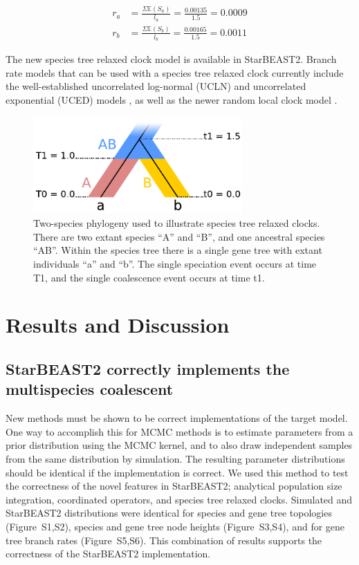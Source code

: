\documentclass[nogrid]{MBE}%
\begin{document}
\begin{align}
r_a &= \frac{\Sigma \mathbb{E}(S_a)}{l_a} = \frac{0.00135}{1.5} = 0.0009\\
r_b &= \frac{\Sigma \mathbb{E}(S_b)}{l_b} = \frac{0.00165}{1.5} = 0.0011
\end{align}

The new species tree relaxed clock model is available in StarBEAST2. Branch rate
models that can be used with a species tree relaxed clock currently include the
well-established uncorrelated log-normal (UCLN) and uncorrelated exponential
(UCED) models \citep{10.1371/journal.pbio.0040088}, as well as the newer random
local clock model \citep{Drummond2010}.

\begin{figure}[htb!]
\centering
\includegraphics[width=80mm]{relaxed_clock.pdf}
\caption
{Two-species phylogeny used to illustrate species tree relaxed
clocks. There are two extant species ``A'' and ``B'', and one ancestral species ``AB''.
Within the species tree there is a single gene tree with extant individuals ``a''
and ``b''. The single speciation event occurs at time T1, and the single coalescence
event occurs at time t1.}
\label{fig:branchRateModel}
\end{figure}

\section{Results and Discussion}

\subsection{StarBEAST2 correctly implements the multispecies coalescent}

New methods must be shown to be correct implementations of the target model.
One way to accomplish this for MCMC methods is to estimate parameters from a
prior distribution using the MCMC kernel, and to also draw independent samples
from the same distribution by simulation. The resulting parameter
distributions should be identical if the implementation is correct. We used
this method to test the correctness of the novel features in StarBEAST2;
analytical population size integration, coordinated operators, and species
tree relaxed clocks. Simulated and StarBEAST2 distributions were identical for
species and gene tree topologies (Figure~S1,S2), species and gene tree node
heights (Figure~S3,S4), and for gene tree branch rates (Figure~S5,S6). This
combination of results supports the correctness of the StarBEAST2
implementation.
\end{document}
